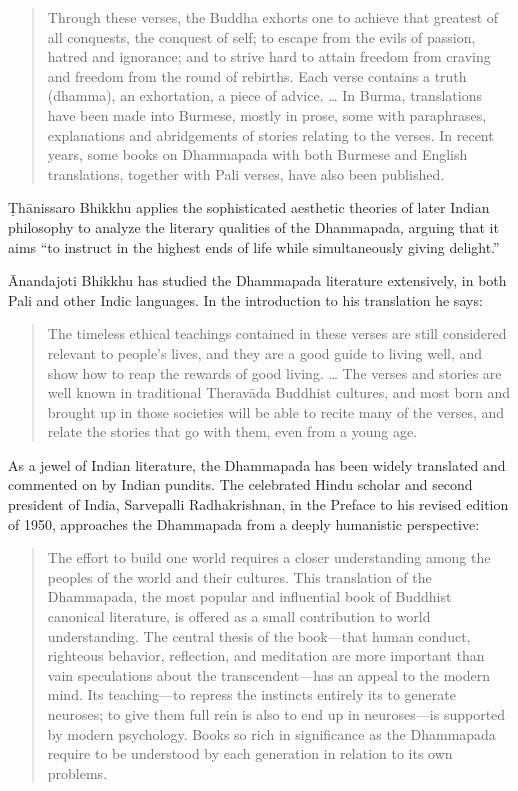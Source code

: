 \documentclass[12pt,openany]{book}%
\begin{document}
\begin{quotation}%
Through these verses, the Buddha exhorts one to achieve that greatest of all conquests, the conquest of self; to escape from the evils of passion, hatred and ignorance; and to strive hard to attain freedom from craving and freedom from the round of rebirths. Each verse contains a truth (dhamma), an exhortation, a piece of advice. … In Burma, translations have been made into Burmese, mostly in prose, some with paraphrases, explanations and abridgements of stories relating to the verses. In recent years, some books on Dhammapada with both Burmese and English translations, together with Pali verses, have also been published.

%
\end{quotation}

\textsanskrit{Ṭhānissaro} Bhikkhu applies the sophisticated aesthetic theories of later Indian philosophy to analyze the literary qualities of the Dhammapada, arguing that it aims “to instruct in the highest ends of life while simultaneously giving delight.”

Ānandajoti Bhikkhu has studied the Dhammapada literature extensively, in both Pali and other Indic languages. In the introduction to his translation he says:

\begin{quotation}%
The timeless ethical teachings contained in these verses are still considered relevant to people’s lives, and they are a good guide to living well, and show how to reap the rewards of good living. … The verses and stories are well known in traditional \textsanskrit{Theravāda} Buddhist cultures, and most born and brought up in those societies will be able to recite many of the verses, and relate the stories that go with them, even from a young age.

%
\end{quotation}

As a jewel of Indian literature, the Dhammapada has been widely translated and commented on by Indian pundits. The celebrated Hindu scholar and second president of India, Sarvepalli Radhakrishnan, in the Preface to his revised edition of 1950, approaches the Dhammapada from a deeply humanistic perspective:

\begin{quotation}%
The effort to build one world requires a closer understanding among the peoples of the world and their cultures. This translation of the Dhammapada, the most popular and influential book of Buddhist canonical literature, is offered as a small contribution to world understanding. The central thesis of the book—that human conduct, righteous behavior, reflection, and meditation are more important than vain speculations about the transcendent—has an appeal to the modern mind. Its teaching—to repress the instincts entirely its to generate neuroses; to give them full rein is also to end up in neuroses—is supported by modern psychology. Books so rich in significance as the Dhammapada require to be understood by each generation in relation to its own problems.

%
\end{quotation}
\end{document}
